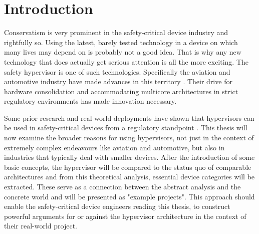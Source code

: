 
\chapter{Introduction} %

\label{Chapter1} %


\newcommand{\keyword}[1]{\textbf{#1}}
\newcommand{\tabhead}[1]{\textbf{#1}}
\newcommand{\code}[1]{\texttt{#1}}
\newcommand{\file}[1]{\texttt{\bfseries#1}}
\newcommand{\option}[1]{\texttt{\itshape#1}}

\newcommand{\mfg}{manufacturer}

Conservatism is very prominent in the safety-critical device industry and rightfully so. Using the latest, barely tested technology in a device on which many lives may depend on is probably not a good idea. That is why any new technology that does actually get serious attention is all the more exciting. The safety hypervisor is one of such technologies. Specifically the aviation and automotive industry have made advances in this territory \cite{reinhardt2014embedded} \cite{vanderleest2015mpsoc}. Their drive for hardware consolidation and accommodating multicore architectures in strict regulatory environments has made innovation necessary.

Some prior research and real-world deployments have shown that hypervisors can be used in safety-critical devices from a regulatory standpoint \cite{larrucea2015modular}.
This thesis will now examine the broader reasons for using hypervisors, not just in the context of extremely complex endeavours like aviation and automotive, but also in industries that typically deal with smaller devices. After the introduction of some basic concepts, the hypervisor will be compared to the status quo of comparable architectures and from this theoretical analysis, essential device categories will be extracted. These serve as a connection between the abstract analysis and the concrete world and will be presented as "example projects".
This approach should enable the safety-critical device engineers reading this thesis, to construct powerful arguments for or against the hypervisor architecture in the context of their real-world project.

